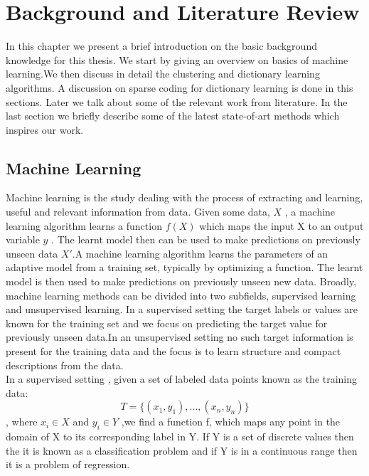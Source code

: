 
\chapter{Background and Literature Review}

\ifpdf
\graphicspath{{Chapter2/Figs/Raster/}{Chapter2/Figs/PDF/}{Chapter2/Figs/}}
\else
\graphicspath{{Chapter2/Figs/Vector/}{Chapter2/Figs/}}
\fi

In this chapter we present a brief introduction on the basic background knowledge for this thesis. We start by giving an overview on basics of machine learning.We then discuss in detail the clustering and dictionary learning algorithms. A discussion on sparse coding for dictionary learning is done in this sections. Later we talk about some of the relevant work from literature. In the last section we briefly describe some of the latest state-of-art methods which inspires our work.
\section[Machine Learning]{Machine Learning}

Machine learning is the study dealing with the process of extracting and learning, useful and relevant information from data. Given some data, $ X $ , a machine learning algorithm learns a function $ f(X) $ which maps the input X to an output variable $y$ . The learnt model then can be used to make predictions on previously unseen data $X'$.A machine learning algorithm learns the parameters of an adaptive model from a training set, typically by optimizing a function. The learnt model is then used to make predictions on previously unseen new data. Broadly, machine learning methods can be divided into two subfields, supervised learning and unsupervised learning. In a supervised setting the target labels or values are known for the training set and we focus on predicting the target value for previously unseen data.In an unsupervised setting no such target information is present for the training data and the focus is to learn structure and compact descriptions from the data.\\

In a supervised setting , given a set of labeled  data points known as the training data: $$ T = \{(x_1,y_1),...,(x_n,y_n)\} $$, where $x_i \in X$ and $y_i \in Y$ ,we find a function f, which maps any point in the domain of X to its corresponding label in Y. If Y is a set of discrete values then the it is known as a classification problem and if Y is in a continuous range then it is a problem of regression.\\

